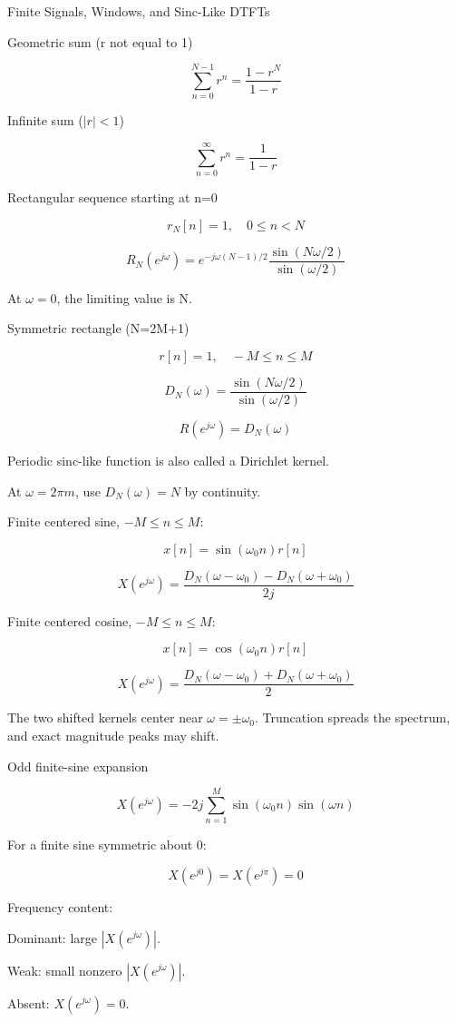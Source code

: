 Finite Signals, Windows, and Sinc-Like DTFTs

Geometric sum (r not equal to 1)

$$\sum_{n=0}^{N-1}r^n=\frac{1-r^N}{1-r}$$

Infinite sum ($|r|<1$)

$$\sum_{n=0}^{\infty}r^n=\frac{1}{1-r}$$

Rectangular sequence starting at n=0

$$r_N[n]=1,\quad 0\le n<N$$

$$R_N(e^{j\omega})=e^{-j\omega(N-1)/2}\frac{\sin(N\omega/2)}{\sin(\omega/2)}$$

At $\omega=0$, the limiting value is N.

Symmetric rectangle (N=2M+1)

$$r[n]=1,\quad -M\le n\le M$$

$$D_N(\omega)=\frac{\sin(N\omega/2)}{\sin(\omega/2)}$$

$$R(e^{j\omega})=D_N(\omega)$$

Periodic sinc-like function is also called a Dirichlet kernel.

At $\omega=2\pi m$, use $D_N(\omega)=N$ by continuity.

Finite centered sine, $-M\le n\le M$:

$$x[n]=\sin(\omega_0 n)r[n]$$

$$X(e^{j\omega})=\frac{D_N(\omega-\omega_0)-D_N(\omega+\omega_0)}{2j}$$

Finite centered cosine, $-M\le n\le M$:

$$x[n]=\cos(\omega_0 n)r[n]$$

$$X(e^{j\omega})=\frac{D_N(\omega-\omega_0)+D_N(\omega+\omega_0)}{2}$$

The two shifted kernels center near $\omega=\pm\omega_0$. Truncation spreads the spectrum, and exact magnitude peaks may shift.

Odd finite-sine expansion

$$X(e^{j\omega})=-2j\sum_{n=1}^{M}\sin(\omega_0 n)\sin(\omega n)$$

For a finite sine symmetric about 0:

$$X(e^{j0})=X(e^{j\pi})=0$$

Frequency content:

Dominant: large $|X(e^{j\omega})|$.

Weak: small nonzero $|X(e^{j\omega})|$.

Absent: $X(e^{j\omega})=0$.
